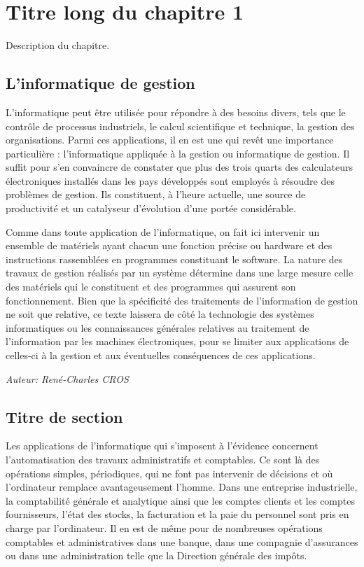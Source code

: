 \chapter[Titre court du chapitre 1] 
        {\singlespacing%
         Titre long du chapitre 1}
         \label{ch:chapitre-1}

    Description du chapitre.

\section{L'informatique de gestion}

     L'informatique peut \^etre utilis\'ee pour r\'epondre \`a des besoins divers, tels que le contr\^ole de processus industriels, le calcul scientifique et technique, la gestion des organisations. Parmi ces applications, il en est une qui rev\^et une importance particuli\`ere : l'informatique appliqu\'ee \`a la gestion ou informatique de gestion. Il suffit pour s'en convaincre de constater que plus des trois quarts des calculateurs \'electroniques install\'es dans les pays d\'evelopp\'es sont employ\'es \`a r\'esoudre des probl\`emes de gestion. Ils constituent, \`a l'heure actuelle, une source de productivit\'e et un catalyseur d'\'evolution d'une port\'ee consid\'erable.

    Comme dans toute application de l'informatique, on fait ici intervenir un ensemble de mat\'eriels ayant chacun une fonction pr\'ecise ou hardware et des instructions rassembl\'ees en programmes constituant le software. La nature des travaux de gestion r\'ealis\'es par un syst\`eme d\'etermine dans une large mesure celle des mat\'eriels qui le constituent et des programmes qui assurent son fonctionnement. Bien que la sp\'ecificit\'e des traitements de l'information de gestion ne soit que relative, ce texte laissera de c\^ot\'e la technologie des syst\`emes informatiques ou les connaissances g\'en\'erales relatives au traitement de l'information par les machines \'electroniques, pour se limiter aux applications de celles-ci \`a la gestion et aux \'eventuelles cons\'equences de ces applications.

{\it Auteur: Ren\'e-Charles CROS}

\section{Titre de section}
        
    Les applications de l'informatique qui s'imposent \`a l'\'evidence concernent l'automatisation des travaux administratifs et comptables. Ce sont l\`a des op\'erations simples, p\'eriodiques, qui ne font pas intervenir de d\'ecisions et o\`u l'ordinateur remplace avantageusement l'homme. Dans une entreprise industrielle, la comptabilit\'e g\'en\'erale et analytique ainsi que les comptes clients et les comptes fournisseurs, l'\'etat des stocks, la facturation et la paie du personnel sont pris en charge par l'ordinateur. Il en est de m\^eme pour de nombreuses op\'erations comptables et administratives dans une banque, dans une compagnie d'assurances ou dans une administration telle que la Direction g\'en\'erale des imp\^ots.

